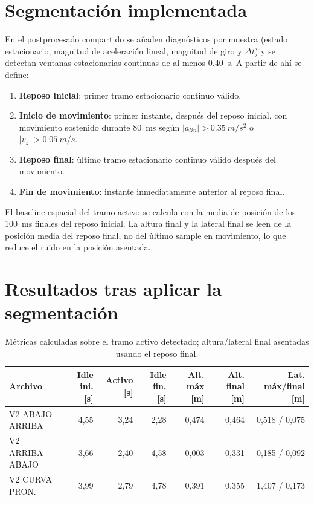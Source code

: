 ﻿\documentclass[11pt,a4paper]{article}
\begin{document}
\section{Segmentaci\'on implementada}
En el postprocesado compartido se a\~naden diagn\'osticos por muestra (estado estacionario, magnitud de aceleraci\'on lineal, magnitud de giro y \(\Delta t\)) y se detectan ventanas estacionarias continuas de al menos \SI{0,40}{s}. A partir de ah\'i se define:
\begin{enumerate}[leftmargin=16pt]
  \item \textbf{Reposo inicial}: primer tramo estacionario continuo v\'alido.
  \item \textbf{Inicio de movimiento}: primer instante, despu\'es del reposo inicial, con movimiento sostenido durante \SI{80}{ms} seg\'un \(|a_{lin}| > \SI{0,35}{m/s^2}\) o \(|v_z| > \SI{0,05}{m/s}\).
  \item \textbf{Reposo final}: \`ultimo tramo estacionario continuo v\'alido despu\'es del movimiento.
  \item \textbf{Fin de movimiento}: instante inmediatamente anterior al reposo final.
\end{enumerate}

El baseline espacial del tramo activo se calcula con la media de posici\'on de los \SI{100}{ms} finales del reposo inicial. La altura final y la lateral final se leen de la posici\'on media del reposo final, no del \`ultimo sample en movimiento, lo que reduce el ruido en la posici\'on asentada.

\section{Resultados tras aplicar la segmentaci\'on}
\begin{table}[h!]
\centering
\small
\begin{tabularx}{\textwidth}{lrrrrrr}
\toprule
Archivo & Idle ini. [s] & Activo [s] & Idle fin. [s] & Alt. m\'ax [m] & Alt. final [m] & Lat. m\'ax/final [m] \\
\midrule
V2 ABAJO--ARRIBA & 4,55 & 3,24 & 2,28 & 0,474 & 0,464 & 0,518 / 0,075 \\
V2 ARRIBA--ABAJO & 3,66 & 2,40 & 4,58 & 0,003 & -0,331 & 0,185 / 0,092 \\
V2 CURVA PRON. & 3,99 & 2,79 & 4,78 & 0,391 & 0,355 & 1,407 / 0,173 \\
\bottomrule
\end{tabularx}
\caption{M\'etricas calculadas sobre el tramo activo detectado; altura/lateral final asentadas usando el reposo final.}
\end{table}
\end{document}
